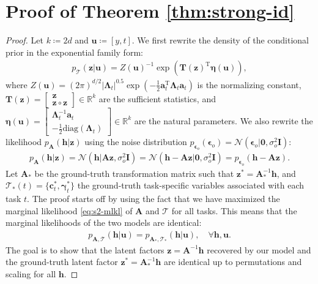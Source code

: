\documentclass[10pt]{article} %
\theoremstyle{plain}
\theoremstyle{definition}
\begin{document}
\section{Proof of Theorem \ref{thm:strong-id}}\label{appendix:proof-causal-id}
\begin{proof}
    Let $k\coloneqq2d$ and $\mathbf{u}\coloneqq[y,t]$. We first rewrite the density of the conditional prior in the exponential family form:
    \begin{align}
        p_{\mathcal{T}}(\mathbf{z}|\mathbf{u}) = Z(\mathbf{u})^{-1}\exp\left(\mathbf{T}(\mathbf{z})^{\text{T}}\boldsymbol{\eta}(\mathbf{u})\right),
    \end{align}
    where $Z(\mathbf{u})=(2\pi)^{d/2}|\boldsymbol{\Lambda}_t|^{0.5}\exp\left(-\frac{1}{2}\mathbf{a}_t^{\text{T}}\boldsymbol{\Lambda}_t\mathbf{a}_t\right)$ is the normalizing constant, $\mathbf{T}(\mathbf{z})=\left[\begin{smallmatrix}\mathbf{z} \\ \mathbf{z}\circ\mathbf{z}\end{smallmatrix}\right]\in\mathbb{R}^{k}$ are the sufficient statistics, and $\boldsymbol{\eta}(\mathbf{u})=\left[\begin{smallmatrix}\boldsymbol{\Lambda}_t^{-1}\mathbf{a}_t \\ -\frac{1}{2}\text{diag}(\boldsymbol{\Lambda}_t)\end{smallmatrix}\right]\in\mathbb{R}^{k}$ are the natural parameters. We also rewrite the likelihood $p_{\mathbf{A}}(\mathbf{h}|\mathbf{z})$ using the noise distribution $p_{\boldsymbol{\epsilon}_o}(\boldsymbol{\epsilon}_o)=\mathcal{N}(\boldsymbol{\epsilon}_o|\mathbf{0},\sigma_o^2\mathbf{I})$:
    \begin{align}
        p_{\mathbf{A}}(\mathbf{h}|\mathbf{z}) =\mathcal{N}(\mathbf{h}|\mathbf{A}\mathbf{z},\sigma_{o}^{2}\mathbf{I})=\mathcal{N}(\mathbf{h}-\mathbf{A}\mathbf{z}|\mathbf{0},\sigma_o^2\mathbf{I})=p_{\boldsymbol{\epsilon}_o}(\mathbf{h}-\mathbf{A}\mathbf{z}).
    \end{align}
    Let $\mathbf{A}_{*}$ be the ground-truth transformation matrix such that $\mathbf{z}^*=\mathbf{A}_{*}^{-1}\mathbf{h}$, and $\mathcal{T}_{*}(t)=\{\mathbf{c}_t^*,\boldsymbol{\gamma}_t^*\}$ the ground-truth task-specific variables associated with each task $t$. The proof starts off by using the fact that we have maximized the marginal likelihood \eqref{eq:s2-mlkl} of $\mathbf{A}$ and $\mathcal{T}$ for all tasks. This means that the marginal likelihoods of the two models are identical:
    \begin{align}\label{eq:equal-mlkl}
        p_{\mathbf{A},\mathcal{T}}(\mathbf{h}|\mathbf{u})=p_{\mathbf{A}_{*},\mathcal{T}_{*}}(\mathbf{h}|\mathbf{u}),\quad\forall\mathbf{h},\mathbf{u}.
    \end{align}
    The goal is to show that the latent factors $\mathbf{z}=\mathbf{A}^{-1}\mathbf{h}$ recovered by our model and the ground-truth latent factor $\mathbf{z}^*=\mathbf{A}_{*}^{-1}\mathbf{h}$ are identical up to permutations and scaling for all $\mathbf{h}$. 
    

\end{proof}
\end{document}
